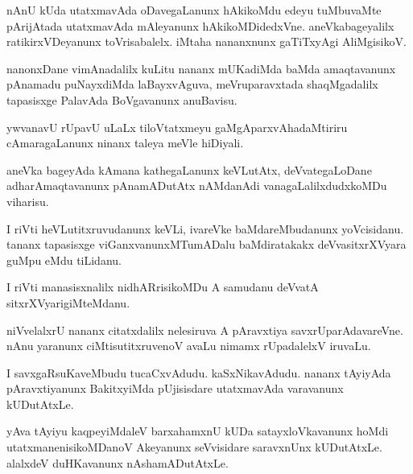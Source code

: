 \documentclass{article}
\begin{document}
\begin{mn}%
nAnU kUda utatxmavAda oDavegaLanunx hAkikoMdu edeyu tuMbuvaMte pArijAtada utatxmavAda 
mAleyanunx hAkikoMDidedxVne. aneVkabageyalilx ratikirxVDeyanunx toVrisabalelx. iMtaha 
nananxnunx gaTiTxyAgi AliMgisikoV.
\end{mn}

\begin{mn}%
nanonxDane vimAnadalilx kuLitu nananx mUKadiMda baMda amaqtavanunx pAnamadu puNayxdiMda 
laBayxvAguva, meVruparavxtada shaqMgadalilx tapasisxge PalavAda BoVgavanunx anuBavisu.
\end{mn}

\begin{mn}%
ywvanavU rUpavU uLaLx tiloVtatxmeyu gaMgAparxvAhadaMtiriru cAmaragaLanunx ninanx taleya 
meVle hiDiyali.
\end{mn}

\begin{mn}%
aneVka bageyAda kAmana kathegaLanunx keVLutAtx, deVvategaLoDane adharAmaqtavanunx 
pAnamADutAtx nAMdanAdi vanagaLalilxdudxkoMDu viharisu.
\end{mn}

\begin{mn}%
I riVti heVLutitxruvudanunx keVLi, ivareVke baMdareMbudanunx yoVcisidanu. tananx 
tapasisxge viGanxvanunxMTumADalu baMdiratakakx deVvasitxrXVyara guMpu eMdu tiLidanu.
\end{mn}

\begin{mn}%
I riVti manasisxnalilx nidhARrisikoMDu A samudanu deVvatA sitxrXVyarigiMteMdanu.
\end{mn}

\begin{mn}%
niVvelalxrU nananx citatxdalilx nelesiruva A pAravxtiya savxrUparAdavareVne. nAnu yaranunx 
ciMtisutitxruvenoV avaLu nimamx rUpadalelxV iruvaLu.
\end{mn}

\begin{mn}%
I savxgaRsuKaveMbudu tucaCxvAdudu. kaSxNikavAdudu. nananx tAyiyAda pAravxtiyanunx 
BakitxyiMda pUjisisdare utatxmavAda varavanunx kUDutAtxLe.
\end{mn}

\begin{mn}%
yAva tAyiyu kaqpeyiMdaleV barxahamxnU kUDa satayxloVkavanunx hoMdi utatxmanenisikoMDanoV 
Akeyanunx seVvisidare saravxnUnx kUDutAtxLe. alalxdeV duHKavanunx nAshamADutAtxLe.
\end{mn}
\end{document}
